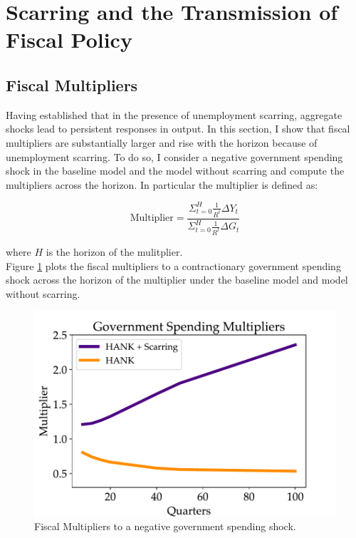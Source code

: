 \section{Scarring and the Transmission of Fiscal Policy}


\hypertarget{Fiscal Multipliers}{}
\subsection{Fiscal Multipliers}

Having established that in the presence of unemployment scarring, aggregate shocks lead to persistent responses in output. In this section, I show that fiscal multipliers are substantially larger and rise with the horizon because of unemployment scarring. To do so, I consider a negative government spending shock in the baseline model and the model without scarring and compute the multipliers across the horizon. In particular the multiplier is defined as:



$$ \text{Multiplier} = \frac{\Sigma_{t=0}^{H}  \frac{1}{R^{t}}\Delta Y_{t}}{ \Sigma_{t=0}^{H}  \frac{1}{R^{t}}\Delta{G_{t}}}$$ 

where $H$ is the horizon of the mulitplier. \\

Figure \ref{Fiscal_multipliers} plots the fiscal multipliers to a contractionary government spending shock across the horizon of the multiplier under the baseline model and model without scarring.


\begin{figure}[!h]
    \centering
   \begin{minipage}{0.68\textwidth}
        \centering
        \includegraphics[scale=.7]{text/chapter1/Figures/multipliers} %
    \end{minipage}
        \caption{Fiscal Multipliers to a negative government spending shock.}
    \label{Fiscal_multipliers}
\end{figure}


